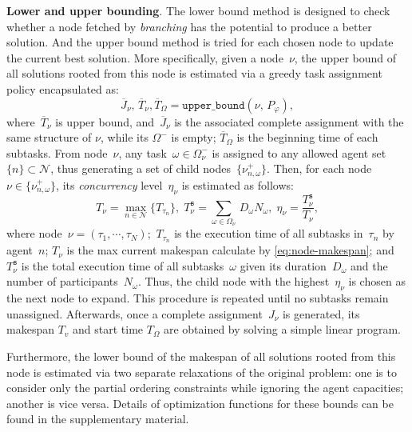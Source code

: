 \textbf{Lower and upper bounding}.
The lower bound method is designed to check whether a node fetched by \emph{branching}
has the potential to produce a better solution.
And the upper bound method is tried for each chosen node to update
 the current best solution.
More specifically, given a node~$\nu$,
the upper bound of all solutions rooted from this node
is estimated via a greedy task assignment policy encapsulated as:
\begin{equation}\label{eq:upper-bound}
\overline{J}_\nu,\, \overline{T}_\nu ,\overline{T}_\Omega= \texttt{upper\_bound}(\nu,\, P_{\varphi}),
\end{equation}
{where~$\overline{T}_\nu$ is upper bound, and~$\overline{J}_\nu$ is the
associated complete assignment with the same structure of $\nu$, while its $\Omega^-$ is empty; $\overline{T}_\Omega$ is the beginning time
of each subtasks.}
From node~$\nu$, any task~$\omega\in \Omega^-_\nu$ is assigned
to any allowed agent set~$\{n\}\subset\mathcal{N}$,
thus generating a set of child nodes~$\{\nu^+_{n,\omega}\}$.
Then, for each node~$\nu\in \{\nu^+_{n,\omega}\}$,
its \emph{concurrency} level~$\eta_{\nu}$ is estimated as follows:
\begin{equation}\label{eq:node-makespan}
T_\nu = \max_{n\in\mathcal{N}} \{T_{\tau_n}\},\;
T^{\texttt{s}}_\nu = \sum_{\omega\in\Omega_\nu}\, D_{\omega}N_\omega,\;
\eta_\nu = \frac{T^{\texttt{s}}_\nu}{T_\nu},
\end{equation}
where node~$\nu=(\tau_1,\cdots,\tau_N)$;~$T_{\tau_n}$ is the execution
time of all subtasks in~$\tau_n$ by agent~$n$;
$T_\nu$ is the max current makespan calculate by \eqref{eq:node-makespan};
and $T^{\texttt{s}}_\nu$ is the total execution time of all subtasks~$\omega$
given its duration~$D_\omega$ and the number of participants~$N_\omega$.
Thus, the child node with the highest~$\eta_{\nu}$ is chosen as
the next node to expand.
This procedure is repeated until no subtasks remain unassigned.
Afterwards, once a complete assignment~$J_\nu$ is generated, its makespan $T_v$ and start time $T_\Omega$ are obtained by
solving a simple linear program.

Furthermore, the lower bound of the makespan of all solutions rooted from this
node is estimated via two separate relaxations of the original problem:
one is to consider only the partial ordering constraints while ignoring
the agent capacities;
another is vice versa. Details of optimization functions for these bounds
can be found in the supplementary material.



